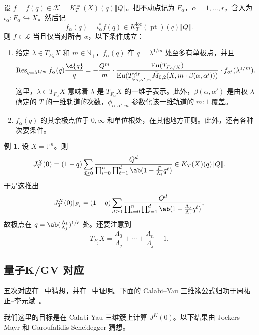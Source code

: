 \documentclass{amsart}
\theoremstyle{definition}
\newtheorem{exm}[thm]{例}
\theoremstyle{remark}
\theoremstyle{plain}
\theoremstyle{definition}
\theoremstyle{remark}
\newcommand{\N}{\mathbb{N}}
\renewcommand{\P}{\mathbb{P}}
\newcommand{\mc}[1]{\mathcal{#1}}
\newcommand{\mr}[1]{\mathrm{#1}}
\newcommand{\on}[1]{\operatorname{#1}}
\newcommand{\1}{\mathbf{1}}
\newcommand{\2}{\mathbf{2}}
\newcommand{\3}{\mathbf{3}}
\newcommand{\vir}{\mr{vir}}
\newcommand{\ps}[1]{\llbracket #1 \rrbracket}
\newcommand{\loc}{\mr{loc}}
\begin{document}
设 \(f = f(q) \in \mc{K} = K_T^{\loc}(X)(q)\ps{Q}\)。把不动点记为 \(F_{\alpha}\)，\(\alpha = 1, \ldots, r\)，含入为 \(\iota_{\alpha} \colon F_{\alpha} \hookrightarrow X\)。然后记
\[ f_{\alpha}(q) = \iota_{\alpha}^* f(q) \in K_T^{\loc}(\on{pt})(q)\ps{Q}. \]
则 \(f \in \mc{L}\) 当且仅当对所有 \(\alpha\)，以下条件成立：
\begin{enumerate}
    \item 给定 \(\lambda \in T_{F_{\alpha}} X\) 和 \(m \in \N_+\)，\(f_{\alpha}(q)\) 在 \(q = \lambda^{1/m}\) 处至多有单极点，并且
        \[ \on{Res}_{q = \lambda^{1/m}} f_{\alpha}(q) \frac{\d{q}}{q} = -\frac{Q^m}{m} \cdot \frac{\on{Eu}(T_{F_{\alpha}/X})}{\on{Eu}(T^{\vir}_{\phi_{\alpha,\alpha',m}}\bar{M}_{0,2}(X, m \cdot \beta(\alpha, \alpha')))} \cdot f_{\alpha'}(\lambda^{1/m}). \]
        这里，\(\lambda \in T_{F_{\alpha}}X\) 意味着 \(\lambda\) 是 \(T_{F_{\alpha}} X\) 的一维子表示。此外，\(\beta(\alpha,\alpha')\) 是由权 \(\lambda\) 确定的 \(T\) 的一维轨道的次数，\(\phi_{\alpha, \alpha', m}\) 参数化该一维轨道的 \(m:1\) 覆盖。
    \item \(f_{\alpha}(q)\) 的其余极点位于 \(0, \infty\) 和单位根处，在其他地方正则。此外，还有各种次要条件。
\end{enumerate}

\begin{exm}
    设 \(X = \P^n\)。则
    \[ J_T^X(0) = (1-q) \sum_{d \geq 0} \frac{Q^d}{\prod_{i=0}^n \prod_{\ell = 1}^d \ab(1 - \frac{P}{\Lambda_i} q^{\ell})} \in K_T(X)(q) \ps{Q}. \]
    于是这推出
    \[ J_T^X(0) |_{F_j} = (1-q) \sum_{d \geq 0} \frac{Q^d}{\prod_{i=0}^n \prod_{\ell = 1}^d \ab(1 - \frac{\Lambda_j}{\Lambda_i}q^{\ell})}, \]
    故极点在 \(q = \ab(\frac{\Lambda_i}{\Lambda_j})^{1/\ell}\) 处。还要注意到
    \[ T_{F_j} X = \frac{\Lambda_0}{\Lambda_j} + \cdots + \frac{\Lambda_n}{\Lambda_j} - 1. \]
\end{exm}

\subsection{量子K/GV 对应}%
\label{sub:Quantum K/GV correspondence}

五次对应在~\cite{GaroufalidisScheidegger2022} 中猜想，并在~\cite{ChouLeeQuintic} 中证明。下面的 Calabi--Yau 三维簇公式归功于周祐正–李元斌~\cite{ChouLee2025}。

我们这里的目标是在 Calabi-Yau 三维簇上计算 \(J^K(0)\)。以下结果由 Jockers-Mayr 和 Garoufalidis-Scheidegger 猜想。
\end{document}
